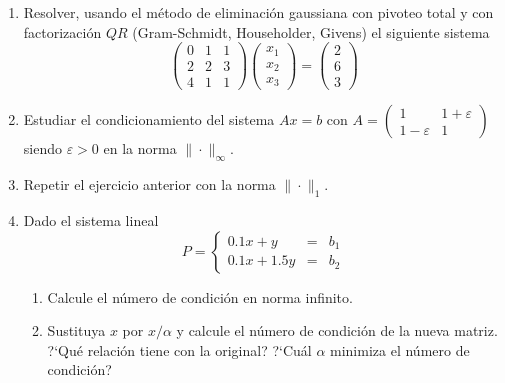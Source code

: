 \documentclass[12pt,letterpaper]{article}
\theoremstyle{plain}
\begin{document}
\begin{enumerate}
\item Resolver, usando el m\'etodo de eliminaci\'on gaussiana con pivoteo total y con factorizaci\'on $QR$ (Gram-Schmidt, Householder, Givens) el siguiente sistema
$$
\left(\begin{array}{ccc}
      0 & 1 & 1  \\
      2 & 2 & 3  \\
      4 & 1 & 1 
      \end{array}\right)\left(\begin{array}{c}
      x_1 \\
      x_2\\
      x_3 
      \end{array}\right)=\left(\begin{array}{c}
      2 \\
      6\\
      3 
      \end{array}\right)
$$

\item Estudiar el condicionamiento del sistema $Ax=b$ con $A=\left(\begin{array}{cc}
                                                                    1 & 1+\varepsilon\\
								    1-\varepsilon & 1
                                                                   \end{array}
\right)$ siendo $\varepsilon>0$ en la norma $\|\cdot\|_{\infty}$.

\item Repetir el ejercicio anterior con la norma $\|\cdot\|_1$.

\item Dado el sistema lineal
$$
P=\left\{\begin{array}{lll}
          0.1x + y & = & b_1\\
	  0.1x + 1.5y & = & b_2
         \end{array}\right.
$$
\begin{enumerate}
\item Calcule el n\'umero de condici\'on en norma infinito.
\item Sustituya $x$ por $x/\alpha$ y calcule el n\'umero de condici\'on de la nueva matriz. ?`Qu\'e relaci\'on tiene con
la original? ?`Cu\'al $\alpha$ minimiza el n\'umero de condici\'on?
\end{enumerate}


\end{enumerate}
\end{document}
